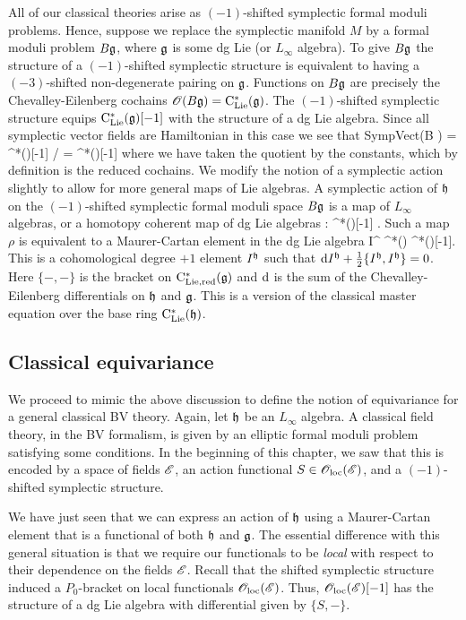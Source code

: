 All of our classical theories arise as $(-1)$-shifted symplectic formal moduli problems.
Hence, suppose we replace the symplectic manifold $M$ by a formal moduli problem $B \mathfrak g$, where $\mathfrak g$ is some dg Lie (or $L_\infty$ algebra). 
To give $B \mathfrak g$ the structure of a $(-1)$-shifted symplectic structure is equivalent to having a $(-3)$-shifted non-degenerate pairing on $\mathfrak g$. 
Functions on $B\mathfrak g$ are precisely the Chevalley-Eilenberg cochains $\mathscr O(B\mathfrak g) = {\rm C}_{{\rm Lie}}^*(\mathfrak g)$. 
The $(-1)$-shifted symplectic structure equips ${\rm C}_{{\rm Lie}}^*(\mathfrak g) [-1]$ with the structure of a dg Lie algebra.
Since all symplectic vector fields are Hamiltonian in this case we see that 
\ben
{\rm SympVect}(B \fg) = \clie^*(\fg)[-1] / \CC = \cred^*(\fg)[-1]
\een
where we have taken the quotient by the constants, which by definition is the reduced cochains. 
We modify the notion of a symplectic action slightly to allow for more general maps of Lie algebras.
A symplectic action of $\mathfrak h$ on the $(-1)$-shifted symplectic formal moduli space $B \mathfrak g$ is a map of $L_\infty$ algebras, or a homotopy coherent map of dg Lie algebras
\ben
\rho : \fh \rightsquigarrow \cred^*(\fg)[-1] .
\een
Such a map $\rho$ is equivalent to a Maurer-Cartan element in the dg Lie algebra
\ben
I^{\fh} \in \clie^*(\fh) \tensor \cred^*(\fg)[-1].
\een
This is a cohomological degree $+1$ element $I^\mathfrak h$ such that ${\rm d} I^\mathfrak h + \frac{1}{2}\{I^\mathfrak h, I^\mathfrak h\} = 0$.
Here $\{-,-\}$ is the bracket on ${\rm C}_{\rm Lie, red}^*(\mathfrak g)$ and ${\rm d}$ is the sum of the Chevalley-Eilenberg differentials on $\mathfrak h$ and $\mathfrak g$. 
This is a version of the classical master equation over the base ring ${\rm C}_{{\rm Lie}}^*(\mathfrak h)$. 

\subsection{Classical equivariance}

We proceed to mimic the above discussion to define the notion of equivariance for a general classical BV theory. 
Again, let $\mathfrak h$ be an $L_\infty$ algebra.
A classical field theory, in the BV formalism, is given by an elliptic formal moduli problem satisfying some conditions. 
In the beginning of this chapter, we saw that this is encoded by a space of fields $\mathscr E$, an action functional $S \in {\mathscr O}_{\rm loc}(\mathscr E)$, and a $(-1)$-shifted symplectic structure. 

We have just seen that we can express an action of $\mathfrak h$ using a Maurer-Cartan element that is a functional of both $\mathfrak h$ and $\mathfrak g$.
The essential difference with this general situation is that we require our functionals to be {\em local} with respect to their dependence on the fields $\mathscr E$. 
Recall that the shifted symplectic structure induced a $P_0$-bracket on local functionals ${\mathscr O}_{\rm loc}(\mathscr E)$.
Thus, ${\mathscr O}_{\rm loc}(\mathscr E)[-1]$ has the structure of a dg Lie algebra with differential given by $\{S,-\}$. 

